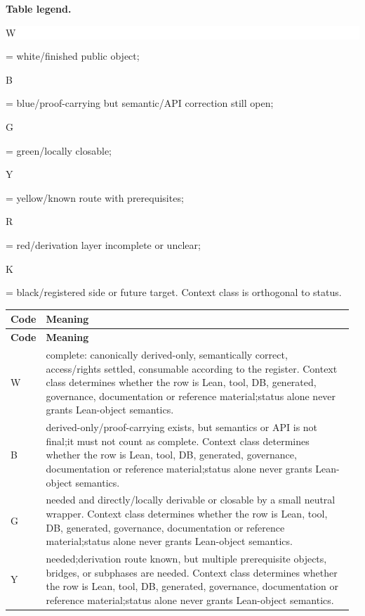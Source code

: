 \small
\par\smallskip\noindent\begin{minipage}{0.99\linewidth}\footnotesize\raggedright\textbf{Table legend.} \colorbox{white}{\strut W} = white/finished public object; \colorbox{cyan!20}{\strut B} = blue/proof-carrying but semantic/API correction still open; \colorbox{green!18}{\strut G} = green/locally closable; \colorbox{yellow!25}{\strut Y} = yellow/known route with prerequisites; \colorbox{red!20}{\strut R} = red/derivation layer incomplete or unclear; \colorbox{black!18}{\strut K} = black/registered side or future target. Context class is orthogonal to status.\end{minipage}\par\vspace{0.25em}
\begin{longtable}{L{0.045\linewidth} L{0.925\linewidth}}
\hline
\textbf{Code} & \textbf{Meaning}\\
\hline
\endfirsthead
\hline
\textbf{Code} & \textbf{Meaning}\\
\hline
\endhead
{}W & complete: canonically derived-only, semantically correct, access/\allowbreak{}rights settled, consumable according to the register. Context class determines whether the row is Lean, tool, DB, generated, governance, documentation or reference material;\newline status alone never grants Lean-object semantics.\\
\hline
\addlinespace[0.24em]
B & derived-only/\allowbreak{}proof-carrying exists, but semantics or API is not final;\newline it must not count as complete. Context class determines whether the row is Lean, tool, DB, generated, governance, documentation or reference material;\newline status alone never grants Lean-object semantics.\\
\hline
\addlinespace[0.24em]
G & needed and directly/\allowbreak{}locally derivable or closable by a small neutral wrapper. Context class determines whether the row is Lean, tool, DB, generated, governance, documentation or reference material;\newline status alone never grants Lean-object semantics.\\
\hline
\addlinespace[0.24em]
Y & needed;\newline derivation route known, but multiple prerequisite objects, bridges, or subphases are needed. Context class determines whether the row is Lean, tool, DB, generated, governance, documentation or reference material;\newline status alone never grants Lean-object semantics.\\

\end{longtable}
